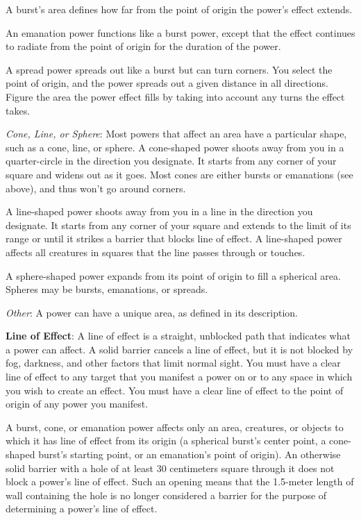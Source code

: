 A burst's area defines how far from the point of origin the power's effect extends.

An emanation power functions like a burst power, except that the effect continues to radiate from the point of origin for the duration of the power.

A spread power spreads out like a burst but can turn corners. You select the point of origin, and the power spreads out a given distance in all directions. Figure the area the power effect fills by taking into account any turns the effect takes.

\textit{Cone, Line, or Sphere}: Most powers that affect an area have a particular shape, such as a cone, line, or sphere. A cone-shaped power shoots away from you in a quarter-circle in the direction you designate. It starts from any corner of your square and widens out as it goes. Most cones are either bursts or emanations (see above), and thus won't go around corners.

A line-shaped power shoots away from you in a line in the direction you designate. It starts from any corner of your square and extends to the limit of its range or until it strikes a barrier that blocks line of effect. A line-shaped power affects all creatures in squares that the line passes through or touches.

A sphere-shaped power expands from its point of origin to fill a spherical area. Spheres may be bursts, emanations, or spreads.

\textit{Other}: A power can have a unique area, as defined in its description.

\textbf{Line of Effect}: A line of effect is a straight, unblocked path that indicates what a power can affect. A solid barrier cancels a line of effect, but it is not blocked by fog, darkness, and other factors that limit normal sight. You must have a clear line of effect to any target that you manifest a power on or to any space in which you wish to create an effect. You must have a clear line of effect to the point of origin of any power you manifest.

A burst, cone, or emanation power affects only an area, creatures, or objects to which it has line of effect from its origin (a spherical burst's center point, a cone-shaped burst's starting point, or an emanation's point of origin). An otherwise solid barrier with a hole of at least 30 centimeters square through it does not block a power's line of effect. Such an opening means that the 1.5-meter length of wall containing the hole is no longer considered a barrier for the purpose of determining a power's line of effect.